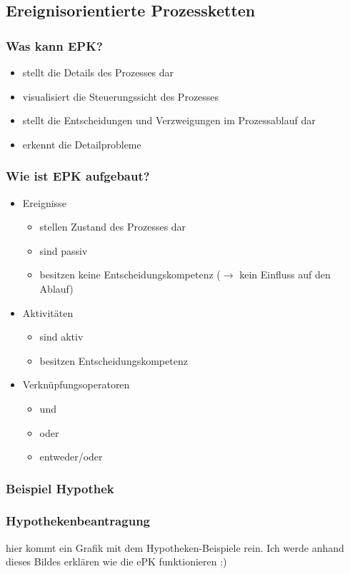 \documentclass[xcolor=dvipsnames]{beamer}
\begin{document}
 \subsection[Ereignisorientierte Prozessketten]{Ereignisorientierte Prozessketten}
 \begin{frame}
  \frametitle{Was kann EPK?}
  \begin{itemize}
  \item stellt die Details des Prozesses dar
  \item visualisiert die Steuerungssicht des Prozesses
  \item stellt die Entscheidungen und Verzweigungen im Prozessablauf dar
  \item erkennt die Detailprobleme
  \end{itemize}
 \end{frame}
 
  \begin{frame}
  \frametitle{Wie ist EPK aufgebaut?}
  \begin{itemize}
  \item Ereignisse 
  \begin{itemize}
  	\item stellen Zustand des Prozesses dar
  	\item sind passiv
  	\item besitzen keine Entscheidungskompetenz ($\rightarrow$ kein Einfluss auf den Ablauf)
  \end{itemize}
  \item Aktivitäten
  	\begin{itemize}
  	\item sind aktiv
  	\item besitzen Entscheidungskompetenz
  \end{itemize}
  \item Verknüpfungsoperatoren
  \begin{itemize}
  	\item und
  	\item oder
  	\item entweder/oder
  \end{itemize}
  \end{itemize}
 \end{frame}
 

 
 \subsubsection{Beispiel Hypothek}
  \begin{frame}
  \frametitle{Hypothekenbeantragung}
hier kommt ein Grafik mit dem Hypotheken-Beispiele rein. Ich werde anhand dieses Bildes erklären wie die ePK funktionieren :)
 \end{frame}
\end{document}
